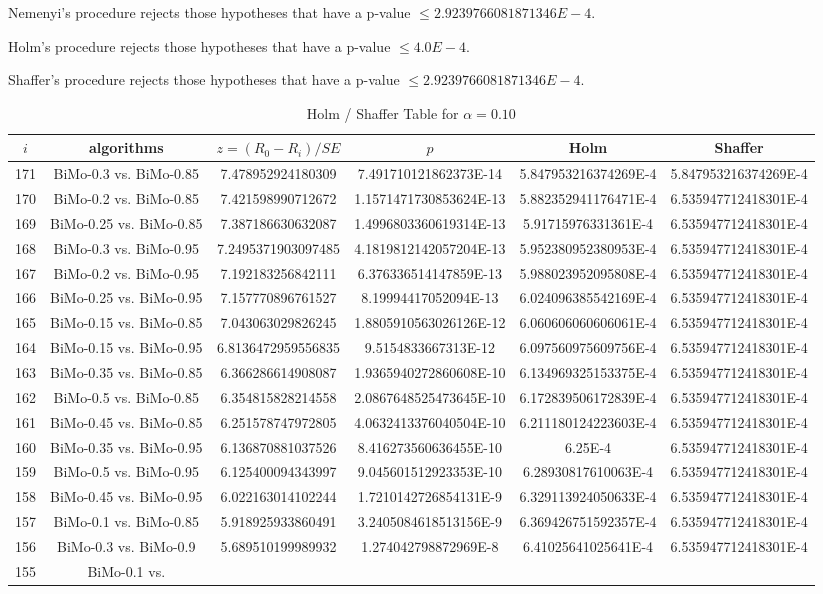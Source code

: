 \documentclass[a4paper,10pt]{article}
\begin{document}
\begin{landscape}
\begin{table}[!htp]
\begin{tabular}{cccccc}
\end{tabular}
\end{table}
Nemenyi's procedure rejects those hypotheses that have a p-value $\le2.9239766081871346E-4$.


Holm's procedure rejects those hypotheses that have a p-value $\le4.0E-4$.


Shaffer's procedure rejects those hypotheses that have a p-value $\le2.9239766081871346E-4$.


\begin{table}[!htp]
\centering\tiny
\caption{Holm / Shaffer Table for $\alpha=0.10$}
\begin{tabular}{cccccc}
$i$&algorithms&$z=(R_0 - R_i)/SE$&$p$&Holm&Shaffer\\
\hline
171&BiMo-0.3 vs. BiMo-0.85&7.478952924180309&7.491710121862373E-14&5.847953216374269E-4&5.847953216374269E-4\\170&BiMo-0.2 vs. BiMo-0.85&7.421598990712672&1.1571471730853624E-13&5.882352941176471E-4&6.535947712418301E-4\\169&BiMo-0.25 vs. BiMo-0.85&7.387186630632087&1.4996803360619314E-13&5.91715976331361E-4&6.535947712418301E-4\\168&BiMo-0.3 vs. BiMo-0.95&7.2495371903097485&4.1819812142057204E-13&5.952380952380953E-4&6.535947712418301E-4\\167&BiMo-0.2 vs. BiMo-0.95&7.192183256842111&6.376336514147859E-13&5.988023952095808E-4&6.535947712418301E-4\\166&BiMo-0.25 vs. BiMo-0.95&7.157770896761527&8.19994417052094E-13&6.024096385542169E-4&6.535947712418301E-4\\165&BiMo-0.15 vs. BiMo-0.85&7.043063029826245&1.8805910563026126E-12&6.060606060606061E-4&6.535947712418301E-4\\164&BiMo-0.15 vs. BiMo-0.95&6.8136472959556835&9.5154833667313E-12&6.097560975609756E-4&6.535947712418301E-4\\163&BiMo-0.35 vs. BiMo-0.85&6.366286614908087&1.9365940272860608E-10&6.134969325153375E-4&6.535947712418301E-4\\162&BiMo-0.5 vs. BiMo-0.85&6.354815828214558&2.0867648525473645E-10&6.172839506172839E-4&6.535947712418301E-4\\161&BiMo-0.45 vs. BiMo-0.85&6.251578747972805&4.0632413376040504E-10&6.211180124223603E-4&6.535947712418301E-4\\160&BiMo-0.35 vs. BiMo-0.95&6.136870881037526&8.416273560636455E-10&6.25E-4&6.535947712418301E-4\\159&BiMo-0.5 vs. BiMo-0.95&6.125400094343997&9.045601512923353E-10&6.28930817610063E-4&6.535947712418301E-4\\158&BiMo-0.45 vs. BiMo-0.95&6.022163014102244&1.7210142726854131E-9&6.329113924050633E-4&6.535947712418301E-4\\157&BiMo-0.1 vs. BiMo-0.85&5.918925933860491&3.2405084618513156E-9&6.369426751592357E-4&6.535947712418301E-4\\156&BiMo-0.3 vs. BiMo-0.9&5.689510199989932&1.274042798872969E-8&6.41025641025641E-4&6.535947712418301E-4\\155&BiMo-0.1 vs. 
\end{tabular}
\end{table}
\end{landscape}
\end{document}
